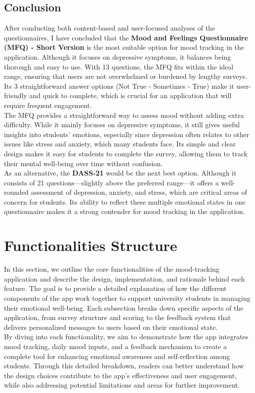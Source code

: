 \subsection{Conclusion}

After conducting both content-based and user-focused analyses of the questionnaires, I have concluded that the \textbf{Mood and Feelings Questionnaire (MFQ) - Short Version} is the most suitable option for mood tracking in the application. Although it focuses on depressive symptoms, it balances being thorough and easy to use. With 13 questions, the MFQ fits within the ideal range, ensuring that users are not overwhelmed or burdened by lengthy surveys. Its 3 straightforward answer options (Not True - Sometimes - True) make it user-friendly and quick to complete, which is crucial for an application that will require frequent engagement.\vspace{5mm} \\
The MFQ provides a straightforward way to assess mood without adding extra difficulty. While it mainly focuses on depressive symptoms, it still gives useful insights into students' emotions, especially since depression often relates to other issues like stress and anxiety, which many students face. Its simple and clear design makes it easy for students to complete the survey, allowing them to track their mental well-being over time without confusion.\vspace{5mm} \\
As an alternative, the \textbf{DASS-21} would be the next best option. Although it consists of 21 questions—slightly above the preferred range—it offers a well-rounded assessment of depression, anxiety, and stress, which are critical areas of concern for students. Its ability to reflect these multiple emotional states in one questionnaire makes it a strong contender for mood tracking in the application.

\section{Functionalities Structure}

In this section, we outline the core functionalities of the mood-tracking application and describe the design, implementation, and rationale behind each feature. The goal is to provide a detailed explanation of how the different components of the app work together to support university students in managing their emotional well-being. Each subsection breaks down specific aspects of the application, from survey structure and scoring to the feedback system that delivers personalized messages to users based on their emotional state.\vspace{5mm} \\
By diving into each functionality, we aim to demonstrate how the app integrates mood tracking, daily mood inputs, and a feedback mechanism to create a complete tool for enhancing emotional awareness and self-reflection among students. Through this detailed breakdown, readers can better understand how the design choices contribute to the app’s effectiveness and user engagement, while also addressing potential limitations and areas for further improvement.

